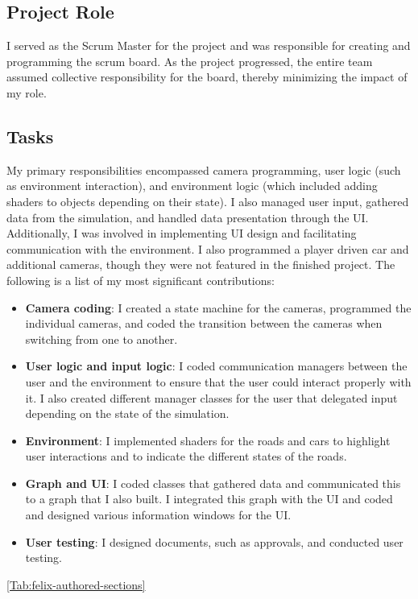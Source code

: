 \subsection{Project Role}
I served as the Scrum Master for the project and was responsible for creating and programming the scrum board. As the project progressed, the entire team assumed collective responsibility for the board, thereby minimizing the impact of my role.

\subsection{Tasks}
My primary responsibilities encompassed camera programming, user logic (such as environment interaction), and environment logic (which included adding shaders to objects depending on their state). I also managed user input, gathered data from the simulation, and handled data presentation through the UI. Additionally, I was involved in implementing UI design and facilitating communication with the environment. I also programmed a player driven car and additional cameras, though they were not featured in the finished project. The following is a list of my most significant contributions:

\begin{itemize}
    \item \textbf{Camera coding}: I created a state machine for the cameras, programmed the individual cameras, and coded the transition between the cameras when switching from one to another.
    \item \textbf{User logic and input logic}: I coded communication managers between the user and the environment to ensure that the user could interact properly with it. I also created different manager classes for the user that delegated input depending on the state of the simulation.
    \item \textbf{Environment}: I implemented shaders for the roads and cars to highlight user interactions and to indicate the different states of the roads.
    \item \textbf{Graph and UI}: I coded classes that gathered data and communicated this to a graph that I also built. I integrated this graph with the UI and coded and designed various information windows for the UI.
    \item \textbf{User testing}: I designed documents, such as approvals, and conducted user testing.
\end{itemize}

    \ref{Tab:felix-authored-sections}

